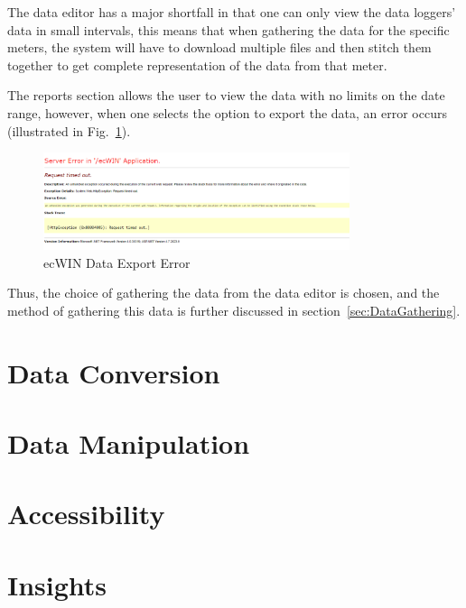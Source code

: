 \documentclass[12pt,onecolumn]{IEEEtran}
\begin{document}
The data editor has a major shortfall in that one can only view the data loggers' data in small intervals, this means that when gathering the data for the specific meters, the system will have to download multiple files and then stitch them together to get complete representation of the data from that meter.

The reports section allows the user to view the data with no limits on the date range, however, when one selects the option to export the data, an error occurs (illustrated in Fig.~\ref{fig:ecwinerror}). 

\begin{center}
    \begin{figure}[htb]
        \centering
        \includegraphics[width=0.8\textwidth]{ecwinerror.png}
        \caption{ecWIN Data Export Error}
        \label{fig:ecwinerror}
    \end{figure}
\end{center}

Thus, the choice of gathering the data from the data editor is chosen, and the method of gathering this data is further discussed in section~\ref{sec:DataGathering}.


\section{Data Conversion} \label{sec:DataConversion}

\section{Data Manipulation} \label{sec:DataManipulation}

\section{Accessibility} \label{sec:Accessibility}

\section{Insights} \label{sec:Insights}


\cite{datasite}



\end{document}
